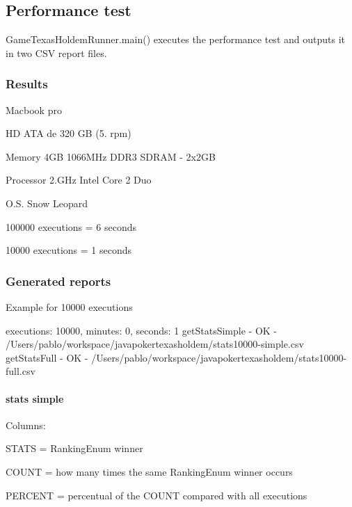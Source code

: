 \subsection*{Performance test}

Game\+Texas\+Holdem\+Runner.\+main() executes the performance test and outputs it in two C\+S\+V report files.

\subsubsection*{Results}


\begin{DoxyItemize}
\item Macbook pro
\item H\+D A\+T\+A de 320 G\+B (5. rpm)
\item Memory 4\+G\+B 1066\+M\+Hz D\+D\+R3 S\+D\+R\+A\+M -\/ 2x2\+G\+B
\item Processor 2.\+G\+Hz Intel Core 2 Duo
\item O.\+S. Snow Leopard
\item 100000 executions = 6 seconds
\item 10000 executions = 1 seconds
\end{DoxyItemize}

\subsubsection*{Generated reports}

Example for 10000 executions \begin{DoxyVerb}executions: 10000, minutes: 0, seconds: 1
getStatsSimple - OK - /Users/pablo/workspace/javapokertexasholdem/stats10000-simple.csv
getStatsFull - OK - /Users/pablo/workspace/javapokertexasholdem/stats10000-full.csv
\end{DoxyVerb}


\paragraph*{stats simple}

Columns\+:


\begin{DoxyItemize}
\item S\+T\+A\+T\+S = Ranking\+Enum winner
\item C\+O\+U\+N\+T = how many times the same Ranking\+Enum winner occurs
\item P\+E\+R\+C\+E\+N\+T = percentual of the C\+O\+U\+N\+T compared with all executions
\end{DoxyItemize}

